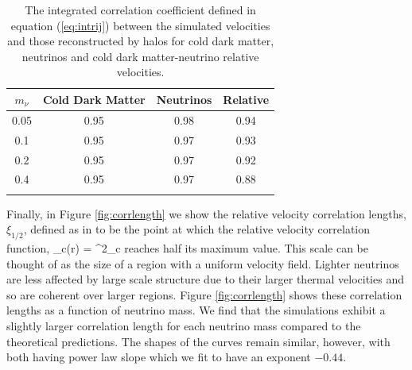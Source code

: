 \begin{table}[b]
\centering
\caption[Simulated and reconstructed relative velocity integraged correlation coefficients]
{The integrated correlation coefficient defined in
equation (\ref{eq:intrij}) between the simulated velocities and those
reconstructed by halos for cold dark matter, neutrinos and
cold dark matter-neutrino relative velocities.}
\vspace{0.2cm}
\begin{tabular} {c c c c}
\hline\hline
$m_\nu$ & Cold Dark Matter & Neutrinos & Relative \\
\hline
 0.05 & 0.95 & 0.98 & 0.94 \\
0.1 & 0.95 & 0.97 & 0.93 \\
0.2 & 0.95 & 0.97 & 0.92 \\
0.4 & 0.95 & 0.97 & 0.88 \\
\vspace{-0.5cm}
\label{tab:corrco}
\end{tabular}
\end{table}

Finally, in Figure \ref{fig:corrlength} we show the relative velocity correlation lengths, $\xi_{1/2}$, defined as in \citet{zhu/etal:2014a} to be the point at which the relative velocity correlation function,
\bq
\xi_{\nu c}(r) = \int {} \Delta^2_{\nu c}
\label{eq:corrfun}
\eq
reaches half its maximum value. This scale can be thought of as the size of a region with a uniform velocity field.  Lighter neutrinos are less affected by large scale structure due to their larger thermal velocities and so are coherent over larger regions. Figure \ref{fig:corrlength} shows these correlation lengths as a function of neutrino mass.  We find that the simulations exhibit a slightly larger correlation length for each neutrino mass compared to the theoretical predictions.  The shapes of the curves remain similar, however, with both having power law slope which we fit to have an exponent $-0.44$.

